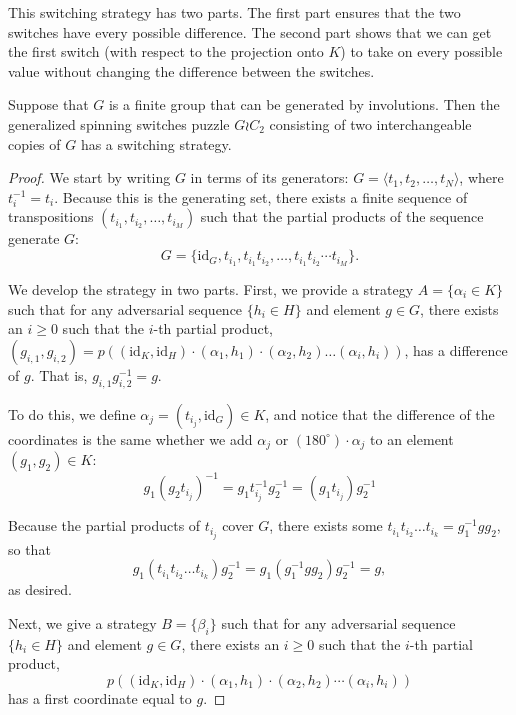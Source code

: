 This switching strategy has two parts.
The first part ensures that the two switches have every possible difference.
The second part shows that we can get the first switch
(with respect to the projection onto $K$) to take on every possible value
without changing the difference between the switches.
\begin{theorem}
  Suppose that $G$ is a finite group that can be generated by involutions.
  Then the generalized spinning switches puzzle $G \wr C_2$ consisting of two
  interchangeable copies of $G$ has a switching strategy.
  \label{thm:involutionGeneratedGroups}
\end{theorem}
\begin{proof}
  We start by writing $G$ in terms of its generators:
  $G = \langle t_1, t_2, \dots, t_N \rangle$, where $t_i^{-1} = t_i$.
  Because this is the generating set, there exists a finite sequence of
  transpositions $(t_{i_1}, t_{i_2}, \dots, t_{i_M})$
  such that the partial products of the sequence generate $G$: \begin{equation}
    G = \{\mathrm{id}_G, t_{i_1}, t_{i_1}t_{i_2}, \dots, t_{i_1}t_{i_2}\cdots t_{i_M}\}.
  \end{equation}

  We develop the strategy in two parts. First, we provide a strategy
  $A = \{\alpha_i \in K\}$ such that for any adversarial sequence $\{h_i \in H\}$
  and element $g \in G$, there exists an $i \geq 0$
  such that the {$i$-th} partial product,
  $(g_{i,1}, g_{i,2}) = p((\mathrm{id}_K, \mathrm{id}_H)\cdot(\alpha_1, h_1)\cdot(\alpha_2, h_2)\dots(\alpha_i, h_i))$,
  has a difference of $g$. That is, $g_{i,1}g_{i,2}^{-1} = g$.

  To do this, we define $\alpha_j = (t_{i_j}, \mathrm{id}_G) \in K$,
  and notice that the difference of the coordinates is the same whether we
  add $\alpha_j$ or $(180^\circ)\cdot \alpha_j$ to an element
  $(g_1, g_2) \in K$: \begin{equation}
    g_1(g_2t_{i_j})^{-1} = g_1t_{i_j}^{-1}g_2^{-1} = (g_1t_{i_j})g_2^{-1}
  \end{equation}

  Because the partial products of $t_{i_j}$ cover $G$, there exists some
  $t_{i_1} t_{i_2}\dots t_{i_k} = g_1^{-1}gg_2$, so that
  \begin{equation}
    g_1(t_{i_1} t_{i_2}\dots t_{i_k})g_2^{-1}
    = g_1(g_1^{-1}gg_2)g_2^{-1}
    = g,
  \end{equation}
  as desired.

  Next, we give a strategy $B = \{\beta_i\}$ such that for any adversarial
  sequence $\{h_i \in H\}$ and element $g \in G$, there exists an $i \geq 0$
  such that the {$i$-th} partial product,
  \begin{equation}
    p((\mathrm{id}_K, \mathrm{id}_H)\cdot(\alpha_1, h_1)\cdot(\alpha_2, h_2)\cdots(\alpha_i, h_i))
  \end{equation}
  has a first coordinate equal to $g$.


\end{proof}
